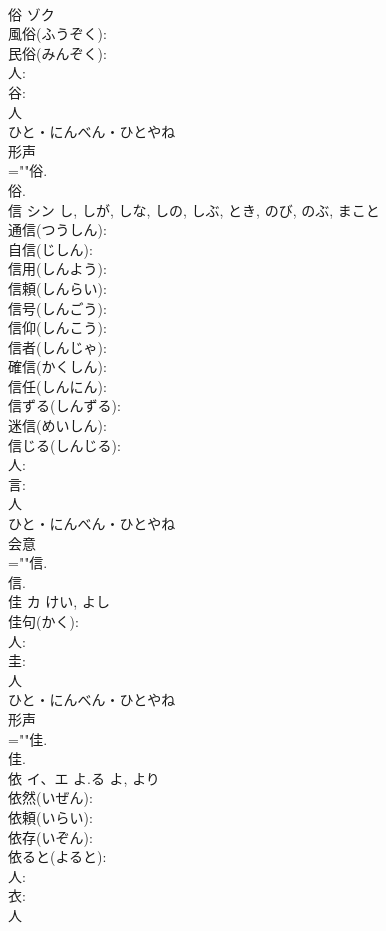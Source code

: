 \documentclass[8pt]{extreport}
\begin{document}
\begin{CJK}{UTF8}{min}
\\	俗	ゾク			
\\	風俗(ふうぞく): 
\\	民俗(みんぞく): 
\\	人: 
\\	谷: 
\\	人	
\\	ひと・にんべん・ひとやね	
\\	形声 
\\	=""俗.
\\	俗.
\\	信	シン		し, しが, しな, しの, しぶ, とき, のび, のぶ, まこと	
\\	通信(つうしん): 
\\	自信(じしん): 
\\	信用(しんよう): 
\\	信頼(しんらい): 
\\	信号(しんごう): 
\\	信仰(しんこう): 
\\	信者(しんじゃ): 
\\	確信(かくしん): 
\\	信任(しんにん): 
\\	信ずる(しんずる): 
\\	迷信(めいしん): 
\\	信じる(しんじる): 
\\	人: 
\\	言: 
\\	人	
\\	ひと・にんべん・ひとやね	
\\	会意 
\\	=""信.
\\	信.
\\	佳	カ		けい, よし	
\\	佳句(かく): 
\\	人: 
\\	圭: 
\\	人	
\\	ひと・にんべん・ひとやね	
\\	形声 
\\	=""佳.
\\	佳.
\\	依	イ、エ	よ.る	よ, より	
\\	依然(いぜん): 
\\	依頼(いらい): 
\\	依存(いぞん): 
\\	依ると(よると): 
\\	人: 
\\	衣: 
\\	人	

\end{CJK}
\end{document}
